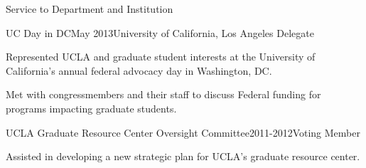 \documentclass{resume} %
\begin{document}
\begin{rSection}{Service to Department and Institution}

\begin{rSubsection}{UC Day in DC}{}{May 2013}{University of California, Los Angeles Delegate}
\item Represented UCLA and graduate student interests at the University of California's annual federal advocacy day in Washington, DC. 
\item Met with congressmembers and their staff to discuss Federal funding for programs impacting graduate students. 
\end{rSubsection}

\begin{rSubsection}{UCLA Graduate Resource Center Oversight Committee}{}{2011-2012}{Voting Member}
\item Assisted in developing a new strategic plan for UCLA's graduate resource center.
\end{rSubsection}
\end{rSection}
\end{document}
